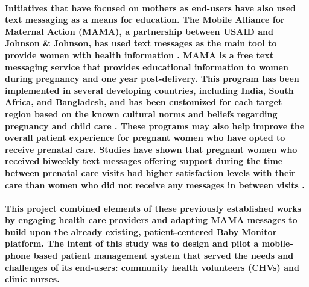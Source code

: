 \paragraph{Initiatives that have focused on mothers as end-users have also used text messaging as a means for education. The Mobile Alliance for Maternal Action (MAMA), a partnership between USAID and Johnson \& Johnson, has used text messages as the main tool to provide women with health information \citep{McCartney2012}. MAMA is a free text messaging service that provides educational information to women during pregnancy and one year post-delivery. This program has been implemented in several developing countries, including India, South Africa, and Bangladesh, and has been customized for each target region based on the known cultural norms and beliefs regarding pregnancy and child care \citep{McCartney2012}. These programs may also help improve the overall patient experience for pregnant women who have opted to receive prenatal care. Studies have shown that pregnant women who received biweekly text messages offering support during the time between prenatal care visits had higher satisfaction levels with their care than women who did not receive any messages in between visits \citep{Jareethum2008}.} 

\paragraph{This project combined elements of these previously established works by engaging health care providers and adapting MAMA messages to build upon the already existing, patient-centered Baby Monitor platform. The intent of this study was to design and pilot a mobile-phone based patient management system that served the needs and challenges of its end-users: community health volunteers (CHVs) and clinic nurses.}